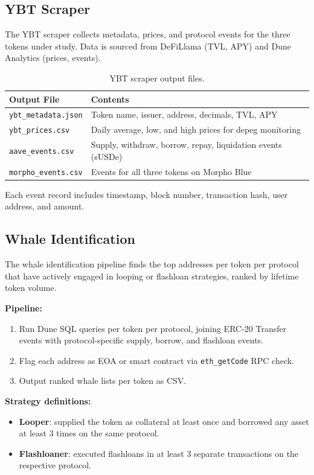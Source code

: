 \subsection{YBT Scraper}

The YBT scraper collects metadata, prices, and protocol events for the three tokens under study. Data is sourced from DeFiLlama (TVL, APY) and Dune Analytics (prices, events).

\begin{table}[h!]
\centering
\caption{YBT scraper output files.}
\label{tab:ybt-output}
\begin{tabular}{lp{7cm}}
\hline
\textbf{Output File} & \textbf{Contents} \\
\hline
\texttt{ybt\_metadata.json} & Token name, issuer, address, decimals, TVL, APY \\
\texttt{ybt\_prices.csv} & Daily average, low, and high prices for depeg monitoring \\
\texttt{aave\_events.csv} & Supply, withdraw, borrow, repay, liquidation events (sUSDe) \\
\texttt{morpho\_events.csv} & Events for all three tokens on Morpho Blue \\
\hline
\end{tabular}
\end{table}

Each event record includes timestamp, block number, transaction hash, user address, and amount.

\subsection{Whale Identification}

The whale identification pipeline finds the top addresses per token per protocol that have actively engaged in looping or flashloan strategies, ranked by lifetime token volume.

\textbf{Pipeline:}
\begin{enumerate}
    \item Run Dune SQL queries per token per protocol, joining ERC-20 Transfer events with protocol-specific supply, borrow, and flashloan events.
    \item Flag each address as EOA or smart contract via \texttt{eth\_getCode} RPC check.
    \item Output ranked whale lists per token as CSV.
\end{enumerate}

\textbf{Strategy definitions:}
\begin{itemize}
    \item \textbf{Looper}: supplied the token as collateral at least once and borrowed any asset at least 3 times on the same protocol.
    \item \textbf{Flashloaner}: executed flashloans in at least 3 separate transactions on the respective protocol.
\end{itemize}

